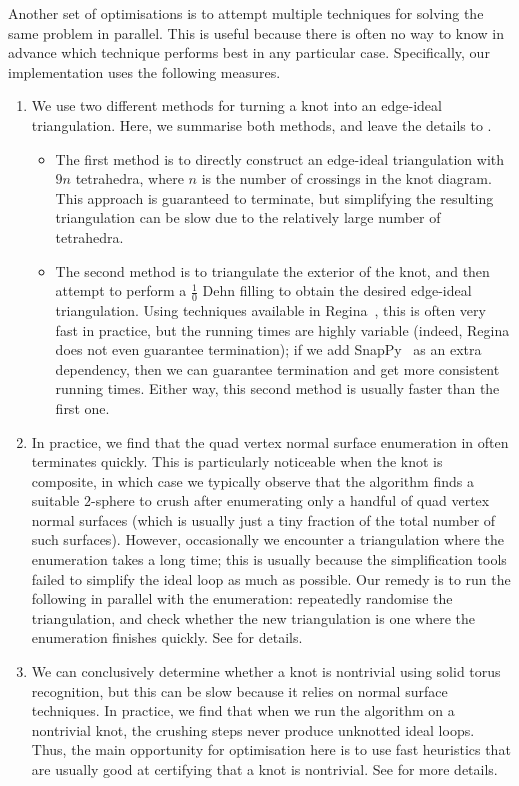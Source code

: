 \documentclass[a4paper,UKenglish,cleveref, autoref, thm-restate]{lipics-v2021}
\begin{document}
Another set of optimisations is to attempt multiple techniques for solving the same problem in parallel. This is useful because there is often no way to know in advance which technique performs best in any particular case.
Specifically, our implementation uses the following measures.
\begin{enumerate}
\item\label{app:bottleneck:buildIdealEdge}
We use two different methods for turning a knot into an edge-ideal triangulation.
Here, we summarise both methods, and leave the details to .
	\begin{itemize}
	\item
	The first method is to directly construct an edge-ideal triangulation with $9n$ tetrahedra, where $n$ is the number of crossings in the knot diagram.
	This approach is guaranteed to terminate, but simplifying the resulting triangulation can be slow due to the relatively large number of tetrahedra.
	\item
	The second method is to triangulate the exterior of the knot, and then attempt to perform a $\frac{1}{0}$ Dehn filling to obtain the desired edge-ideal triangulation.
	Using techniques available in Regina~\cite{Regina}, this is often very fast in practice,
	but the running times are highly variable (indeed, Regina does not even guarantee termination);
	if we add SnapPy~\cite{SnapPy} as an extra dependency, then we can guarantee termination and get more consistent running times.
	Either way, this second method is usually faster than the first one.
	\end{itemize}
\item\label{app:bottleneck:enumerate}
In practice, we find that the quad vertex normal surface enumeration in  often terminates quickly.
This is particularly noticeable when the knot is composite, in which case we typically observe that the algorithm finds a suitable $2$-sphere to crush after enumerating only a handful of quad vertex normal surfaces
(which is usually just a tiny fraction of the total number of such surfaces).
However, occasionally we encounter a triangulation where the enumeration takes a long time;
this is usually because the simplification tools failed to simplify the ideal loop as much as possible.
Our remedy is to run the following in parallel with the enumeration: repeatedly randomise the triangulation, and check whether the new triangulation is one where the enumeration finishes quickly.
See  for details.
\item\label{app:bottleneck:nontriviality}
We can conclusively determine whether a knot is nontrivial using solid torus recognition, but this can be slow because it relies on normal surface techniques.
In practice, we find that when we run the algorithm on a nontrivial knot, the crushing steps never produce unknotted ideal loops.
Thus, the main opportunity for optimisation here is to use fast heuristics that are usually good at certifying that a knot is nontrivial.
See  for more details.
\end{enumerate}
\end{document}
